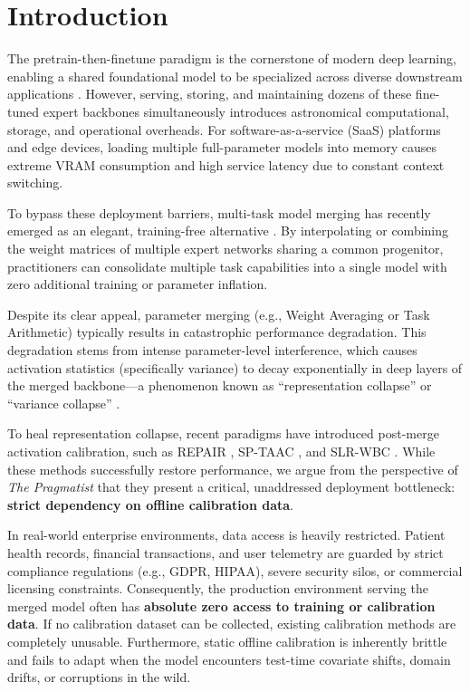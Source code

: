 \documentclass{article}
\theoremstyle{plain}
\theoremstyle{definition}
\theoremstyle{remark}
\begin{document}
\section{Introduction}
\label{intro}

The pretrain-then-finetune paradigm is the cornerstone of modern deep learning, enabling a shared foundational model to be specialized across diverse downstream applications \cite{vaswani2017attention, caruana1997multitask}. However, serving, storing, and maintaining dozens of these fine-tuned expert backbones simultaneously introduces astronomical computational, storage, and operational overheads. For software-as-a-service (SaaS) platforms and edge devices, loading multiple full-parameter models into memory causes extreme VRAM consumption and high service latency due to constant context switching.

To bypass these deployment barriers, multi-task model merging has recently emerged as an elegant, training-free alternative \cite{wortsman2022model, ilharco2022editing}. By interpolating or combining the weight matrices of multiple expert networks sharing a common progenitor, practitioners can consolidate multiple task capabilities into a single model with zero additional training or parameter inflation.

Despite its clear appeal, parameter merging (e.g., Weight Averaging or Task Arithmetic) typically results in catastrophic performance degradation. This degradation stems from intense parameter-level interference, which causes activation statistics (specifically variance) to decay exponentially in deep layers of the merged backbone---a phenomenon known as ``representation collapse'' or ``variance collapse'' \cite{jordan2023repair}.

To heal representation collapse, recent paradigms have introduced post-merge activation calibration, such as REPAIR \cite{jordan2023repair}, SP-TAAC \cite{sptaac2026}, and SLR-WBC \cite{slrwbc2026}. While these methods successfully restore performance, we argue from the perspective of \textit{The Pragmatist} that they present a critical, unaddressed deployment bottleneck: \textbf{strict dependency on offline calibration data}.

In real-world enterprise environments, data access is heavily restricted. Patient health records, financial transactions, and user telemetry are guarded by strict compliance regulations (e.g., GDPR, HIPAA), severe security silos, or commercial licensing constraints. Consequently, the production environment serving the merged model often has \textbf{absolute zero access to training or calibration data}. If no calibration dataset can be collected, existing calibration methods are completely unusable. Furthermore, static offline calibration is inherently brittle and fails to adapt when the model encounters test-time covariate shifts, domain drifts, or corruptions in the wild.
\end{document}
